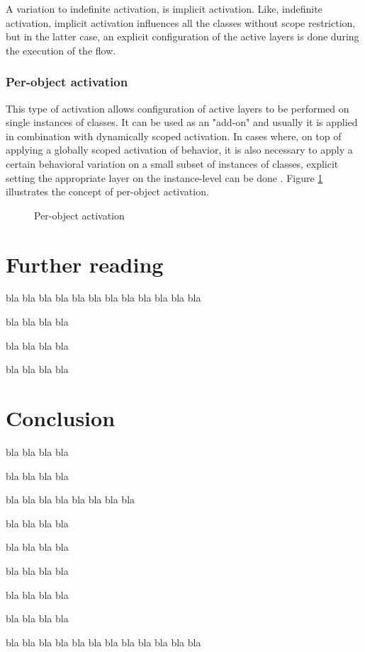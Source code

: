 \documentclass{acm_proc_article-sp}
\begin{document}
A variation to indefinite activation, is implicit activation. Like, indefinite activation, implicit activation influences all the classes without scope restriction, but in the latter case, an explicit configuration of the active layers is done during the execution of the flow. 

\subsubsection{Per-object activation}
\label{per_object_activation}
This type of activation allows configuration of active layers to be performed on single instances of classes. It can be used as an "add-on" and usually it is applied in combination with dynamically scoped activation. In cases where, on top of applying a  globally scoped activation of behavior, it is also necessary to apply a certain behavioral variation on a small subset of instances of classes, explicit setting the appropriate layer on the instance-level can be done \cite{SALVANESCHI20121801}. Figure  \ref{fig:per_object_activation} illustrates the concept of per-object activation.

\begin{figure}[H]
\centering
{}
\caption{Per-object activation}
\label{fig:per_object_activation}
\end{figure}

\section{Further reading}
\label{sec:further_reading}

bla bla bla bla
bla bla bla bla
bla bla bla bla



bla bla bla bla

bla bla bla bla

bla bla bla bla

\section{Conclusion}
\label{sec:conclusion}

bla bla bla bla

bla bla bla bla

bla bla bla bla
bla bla bla bla


bla bla bla bla

bla bla bla bla

bla bla bla bla

bla bla bla bla

bla bla bla bla

bla bla bla bla
bla bla bla bla
bla bla bla bla



\end{document}
